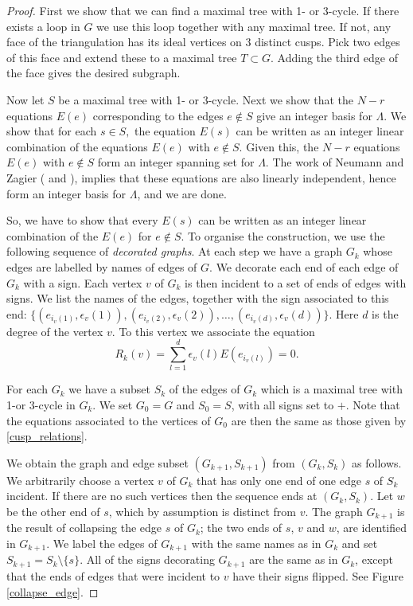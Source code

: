 \documentclass[12pt]{amsart}
\theoremstyle{definition}
\theoremstyle{remark}
\begin{document}
\begin{proof}  First we show that we can find a maximal tree with 1- or 3-cycle.  
If there exists a loop in $G$ we use this loop together with any maximal tree.
If not, any face of the triangulation has its ideal vertices on 3 distinct cusps.
Pick two edges of this face and  extend these to a maximal tree $T \subset G$. Adding
the third edge of the face gives the desired subgraph.

Now let $S$ be a maximal tree with 1- or 3-cycle. Next we show that the $N-r$ equations $E(e)$ corresponding to the edges $e \notin S$ give 
an integer basis for $\Lambda$.  We show that for each $s\in S,$ the equation $E(s)$ can be written as an integer linear combination of
the equations $E(e)$ with $e \notin S$. Given this, the $N-r$ equations $E(e)$ with $e \notin S$ form an integer spanning set for $\Lambda$. The work of
Neumann and Zagier (\cite{NZ} and \cite[Thm 4.1]{Neumann-combi}), implies that these equations are also linearly independent, hence form an integer basis for $\Lambda$, and we are done.

So, we have to show that every $E(s)$ can be written as an integer linear combination of the $E(e)$ for $e\notin S$. To organise the construction, we use the following sequence of \emph{decorated graphs}. At each step we have a graph $G_k$ whose edges are labelled by names of  edges of $G$. 
We decorate each end of each edge of $G_k$ with a sign. Each vertex $v$ of $G_k$ is then incident to a set of ends of edges with signs. We list the names of the edges, together with the sign associated to this end: $\{ (e_{i_v(1)}, \epsilon_v(1)), (e_{i_v(2)}, \epsilon_v(2)), \ldots, (e_{i_v(d)}, \epsilon_v(d))\}$. Here $d$ is the degree of the vertex $v$. To this vertex we associate the equation
$$R_k(v) = \sum_{l=1}^d \epsilon_v(l) E(e_{i_v(l)})=0.$$

For each $G_k$ we have a subset $S_k$ of the edges of $G_k$ which is a maximal tree with 1-or 3-cycle in $G_k$. We set $G_0=G$ and $S_0=S$, with all signs set to $+$. Note that the equations associated to the vertices of $G_0$ are then the same as those given by  \eqref{cusp_relations}. 

We obtain the graph and edge subset $(G_{k+1},S_{k+1})$ from $(G_{k},S_{k})$ as follows. We arbitrarily choose a vertex $v$ of $G_k$ that has only one end of one edge $s$ of $S_k$ incident.  If there are no such vertices then the sequence ends at $(G_k,S_k)$. Let $w$ be the other end of $s$, which by assumption is distinct from $v$. The graph $G_{k+1}$ is the result of collapsing the edge $s$ of $G_k$; the two ends of $s$, $v$ and $w$, are identified in $G_{k+1}$. We label the edges of $G_{k+1}$ with the same names as in $G_k$ and set $S_{k+1}=S_k \setminus \{s\}.$ All of the signs decorating $G_{k+1}$ are the same as in $G_k$, except that the ends of edges that were incident to $v$ have their signs flipped. See Figure \ref{collapse_edge}.


\end{proof}
\end{document}
